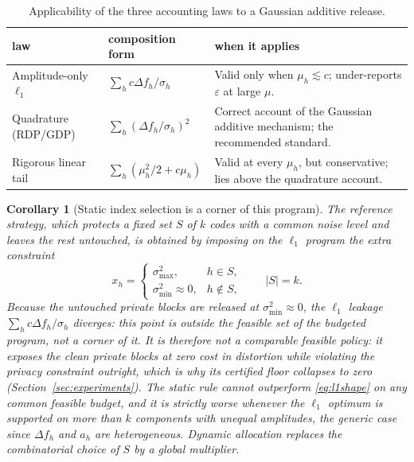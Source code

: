 \documentclass{ieeetj}
\theoremstyle{plain}
\newtheorem{corollary}{Corollary}
\theoremstyle{definition}
\begin{document}
\begin{table}[h]
\centering\footnotesize
\setlength{\tabcolsep}{3.5pt}
\caption{Applicability of the three accounting laws to a Gaussian additive
release.}
\label{tab:laws}
\begin{tabular}{p{2.5cm}p{2.6cm}p{2.6cm}}
\toprule
law & composition form & when it applies \\
\midrule
Amplitude-only $\ell_1$ & $\sum_h c\Delta f_h/\sigma_h$ & Valid only when
$\mu_h\lesssim c$; under-reports $\varepsilon$ at large $\mu$. \\
Quadrature (RDP/GDP) & $\sum_h(\Delta f_h/\sigma_h)^{2}$ & Correct account
of the Gaussian additive mechanism; the recommended standard. \\
Rigorous linear tail & $\sum_h(\mu_h^2/2+c\mu_h)$ & Valid at every $\mu_h$,
but conservative; lies above the quadrature account. \\
\bottomrule
\end{tabular}
\end{table}

\begin{corollary}[Static index selection is a corner of this program]
\label{co:static}
The reference strategy, which protects a fixed set $S$ of $k$ codes with a common
noise level and leaves the rest untouched, is obtained by imposing on the
$\ell_1$ program the extra constraint
\begin{equation}
x_h=
\begin{cases}
\sigma_{\max}^{2}, & h\in S,\\
\sigma_{\min}^{2}\approx 0, & h\notin S,
\end{cases}
\qquad |S|=k.
\end{equation}
Because the untouched private blocks are released at $\sigma_{\min}^2\approx0$, the
$\ell_1$ leakage $\sum_h c\Delta f_h/\sigma_h$ diverges: this point is \emph{outside}
the feasible set of the budgeted program, not a corner of it. It is therefore
not a comparable feasible policy: it exposes the clean private blocks at zero
cost in distortion while violating the privacy constraint outright, which is
why its certified floor collapses to zero (Section~\ref{sec:experiments}). The
static rule cannot outperform \eqref{eq:l1shape} on any common feasible
budget, and it is strictly worse whenever the $\ell_1$ optimum is supported on
more than $k$ components with unequal amplitudes, the generic case since
$\Delta f_h$ and $a_h$ are heterogeneous. Dynamic allocation replaces the
combinatorial choice of $S$ by a global multiplier.
\end{corollary}
\end{document}
